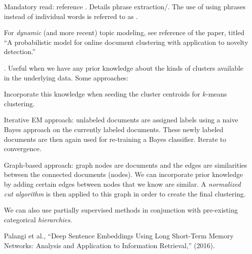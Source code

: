 \documentclass[11pt]{article}
\newcommand\myspace[1][]{\vspace{#1\bigskipamount}}
\newcommand\p{\Needspace{10\baselineskip} \noindent}
\newcommand\myref[1]{\purple{[#1]}}
\begin{document}
\myspace
\p {}
\begin{compactitem}
	\item Mandatory read: reference \myref{61}. Details phrase extraction/. The use of using phrases instead of individual words is referred to as . 
	\item For \textit{dynamic} (and more recent) topic modeling, see reference \myref{107} of the paper, titled ``A probabilistic model for online document clustering with application to novelty detection.''
\end{compactitem}


\myspace
\p {}. Useful when we have any prior knowledge about the kinds of clusters available in the underlying data. Some approaches:
\begin{compactitem}
	\item Incorporate this knowledge when seeding the cluster centroids for $k$-means clustering. 
	
	\item Iterative EM approach: unlabeled documents are assigned labels using a naive Bayes approach on the currently labeled documents. These newly labeled documents are then again used for re-training a Bayes
	classifier. Iterate to convergence.
	
	\item Graph-based approach: graph nodes are documents and the edges are similarities between the connected documents (nodes). We can incorporate prior knowledge by adding certain edges between nodes that we know are similar. A \textit{normalized cut algorithm} is then applied to this graph in order to create the final clustering.
\end{compactitem}
We can also use partially supervised methods in conjunction with pre-existing categorical \textit{hierarchies}. 





\vspace{-1em}
{\footnotesize Palangi et al., ``Deep Sentence Embeddings Using Long Short-Term Memory Networks: Analysis and Application to Information Retrieval,'' (2016).}
\end{document}

